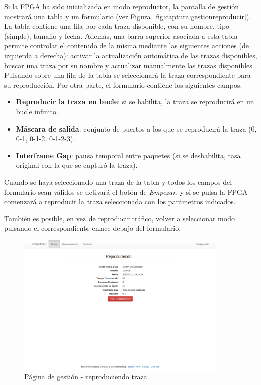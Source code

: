 Si la \gls{FPGA} ha sido inicializada en modo reproductor, la pantalla de gestión mostrará una tabla y un formulario (ver Figura~\ref{fig:captura:gestionreproducir}).
La tabla contiene una fila por cada \gls{traza} disponible, con su nombre, tipo (\gls{simple}), tamaño y fecha.
Además, una barra superior asociada a esta tabla permite controlar el contenido de la misma mediante las siguientes acciones (de izquierda a derecha): activar la actualización automática de las \glspl{traza} disponibles, buscar una \gls{traza} por su nombre y actualizar manualmente las \glspl{traza} disponibles.
Pulsando sobre una fila de la tabla se seleccionará la \gls{traza} correspondiente para su reproducción.
Por otra parte, el formulario contiene los siguientes campos:
\begin{itemize}
  \item \textbf{Reproducir la \gls{traza} en bucle}: si se habilita, la \gls{traza} se reproducirá en un bucle infinito.
  \item \textbf{Máscara de salida}: conjunto de puertos a los que se reproducirá la \gls{traza} (0, 0-1, 0-1-2, 0-1-2-3).
  \item \textbf{Interframe Gap}: pausa temporal entre paquetes (si se deshabilita, tasa original con la que se capturó la \gls{traza}).
\end{itemize}

Cuando se haya seleccionado una traza de la tabla y todos los campos del formulario sean válidos se activará el botón de \textit{Empezar}, y si se pulsa la \gls{FPGA} comenzará a reproducir la \gls{traza} seleccionada con los parámetros indicados.

También es posible, en vez de reproducir tráfico, volver a seleccionar modo pulsando el correspondiente enlace debajo del formulario.

\begin{figure}[!htp]
  \centering
  \includegraphics[width=0.9\textwidth,clip=true]{graphics/capturas/gestor_reproduccion}
  \caption{Página de gestión - reproduciendo \gls{traza}.}
  \label{fig:captura:gestionreproduciendo}
\end{figure}

